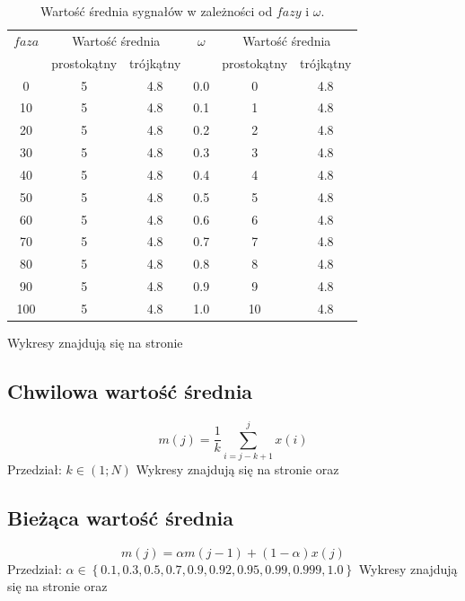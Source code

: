 \documentclass[wide,a4paper,titlepage,12pt]{mwart}
\begin{document}
      \begin{table}[h]
        \begin{center}
          \begin{tabular}{|c|c|c|c|c|c|}
            \hline
              $faza$ &
              \multicolumn{2}{|c|}{Wartość średnia} &
              $\omega$ &
              \multicolumn{2}{|c|}{Wartość średnia} \\
               & prostokątny & trójkątny & & prostokątny & trójkątny \\
            \hline
              0 & 5 & 4.8   & 0.0 & 0 & 4.8 \\
              10 & 5 & 4.8   & 0.1 & 1 & 4.8 \\
              20 & 5 & 4.8   & 0.2 & 2 & 4.8 \\
              30 & 5 & 4.8   & 0.3 & 3 & 4.8 \\
              40 & 5 & 4.8   & 0.4 & 4 & 4.8 \\
              50 & 5 & 4.8   & 0.5 & 5 & 4.8 \\
              60 & 5 & 4.8   & 0.6 & 6 & 4.8 \\
              70 & 5 & 4.8   & 0.7 & 7 & 4.8 \\
              80 & 5 & 4.8   & 0.8 & 8 & 4.8 \\
              90 & 5 & 4.8   & 0.9 & 9 & 4.8 \\
              100 & 5 & 4.8   & 1.0 & 10 & 4.8 \\
            \hline
          \end{tabular}
        
          \caption{Wartość średnia sygnałów w zależności od $fazy$ i $\omega$.}
        \end{center}
      \end{table}
      
      Wykresy znajdują się na stronie \pageref{wykres2}
    
    \subsection{Chwilowa wartość średnia}
      \begin{displaymath}
        m(j) = \frac{1}{k} \sum^{j}_{i=j-k+1} x(i)
      \end{displaymath}
      Przedział: $k \in (1 ; N)$
      \newline
      Wykresy znajdują się na stronie \pageref{wykres3} oraz \pageref{wykres4}
    
    \subsection{Bieżąca wartość średnia}
      \begin{displaymath}
        m(j) = \alpha m(j-1) + (1-\alpha) x(j)
      \end{displaymath}
      Przedział: $\alpha \in \left \{0.1, 0.3, 0.5, 0.7, 0.9, 0.92, 0.95, 0.99, 0.999, 1.0\right \}$
      \newline
      Wykresy znajdują się na stronie \pageref{wykres5} oraz \pageref{wykres6}
      
\end{document}
